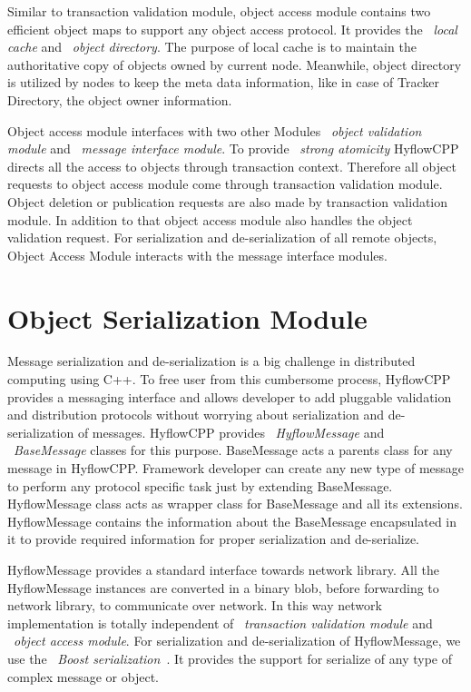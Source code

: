 \documentclass[12pt,english]{report}
\begin{document}
Similar to transaction validation module, object access module contains two efficient object maps to support any object access protocol. It provides the ~\emph{local cache} and ~\emph{object directory}. The purpose of local cache is to maintain the authoritative copy of objects owned by current node. Meanwhile, object directory is utilized by nodes to keep the meta data information, like in case of Tracker Directory, the object owner information. 

Object access module interfaces with two other Modules ~\emph{object validation module} and ~\emph{message interface module}. To provide ~\emph{strong atomicity} HyflowCPP directs all the access to objects through transaction context. Therefore all object requests to object access module come through transaction validation module. Object deletion or publication requests are also made by transaction validation module. In addition to that object access module also handles the object validation request. For  serialization and de-serialization of all remote objects, Object Access Module interacts with the message interface modules.

\section{Object Serialization Module}

Message serialization and de-serialization is a big challenge in distributed computing using C++. To free user from this cumbersome process, HyflowCPP provides a messaging interface and allows developer to add pluggable validation and distribution protocols without worrying about serialization and de-serialization of messages. HyflowCPP provides ~\emph{HyflowMessage} and ~\emph{BaseMessage} classes for this purpose. BaseMessage acts a parents class for any message in HyflowCPP. Framework developer can create any new type of message to perform any protocol specific task just by extending BaseMessage. HyflowMessage class acts as wrapper class for BaseMessage and all its extensions. HyflowMessage contains the information about the BaseMessage encapsulated in it to provide required information for proper serialization and de-serialize.

HyflowMessage provides a standard interface towards network library. All the HyflowMessage instances are converted in a binary blob, before forwarding to network library, to communicate over network. In this way network implementation is totally independent of ~\emph{transaction validation module} and ~\emph{object access module}. For serialization and de-serialization of HyflowMessage, we use the ~\emph{Boost serialization}~\cite{karlsson2005beyond}. It provides the support for serialize of any type of complex message or object.  
\end{document}
